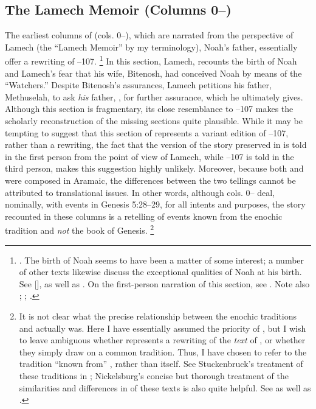 \subsection{The Lamech Memoir (Columns 0--)}
The earliest columns of \ga (cols. 0--), which are narrated from the perspective of Lamech (the ``Lamech Memoir'' by my terminology), Noah's father, essentially offer a rewriting of --107.%
    \footnote{\Cite[174]{nickelsburg2005}. The birth of Noah seems to have been a matter of some interest; a number of other texts likewise discuss the exceptional qualities of Noah at his birth. See [],  as well as \cite{vanderkam_kapera1992}. On the first-person narration of this section, see \cite{weigold_as2010}. Note also \cite{stuckenbruck_berthelot-etal2010}; \cite{baxter_jsp2006}; \cite{peters_falk-etal2010}.}
In this section, Lamech, recounts the birth of Noah and Lamech's fear that his wife, Bitenosh, had conceived Noah by means of the  ``Watchers.'' Despite Bitenosh's assurances, Lamech petitions his father, Methuselah, to ask \emph{his} father, \enoch, for further assurance, which he ultimately gives. Although this section is fragmentary, its close resemblance to --107 makes the scholarly reconstruction of the missing sections quite plausible. While it may be tempting to suggest that this section of \ga represents a variant edition of --107, rather than a rewriting, the fact that the version of the story preserved in \ga is told in the first person from the point of view of Lamech, while --107 is told in the third person, makes this suggestion highly unlikely. Moreover, because both \firstenoch and \ga were composed in Aramaic, the differences between the two tellings cannot be attributed to translational issues. In other words, although cols. 0-- deal, nominally, with events in Genesis 5:28--29, for all intents and purposes, the story recounted in these columns is a retelling of events known from the enochic tradition and \emph{not} the book of Genesis.%
    \footnote{It is not clear what the precise relationship between the enochic traditions and \ga actually was. Here I have essentially assumed the priority of \firstenoch, but I wish to leave ambiguous whether \ga represents a rewriting of the \emph{text} of \firstenoch, or whether they simply draw on a common tradition. Thus, I have chosen to refer to the tradition ``known from'' \firstenoch, rather than \firstenoch itself. See Stuckenbruck's treatment of these traditions in \cite*{stuckenbruck_berthelot-etal2010}; Nickelsburg's concise but thorough treatment of the similarities and differences in of these texts is also quite helpful. See \cite[173--174]{nickelsburg2005} as well as \cite[122--123]{fitzmyer2004}.} 


